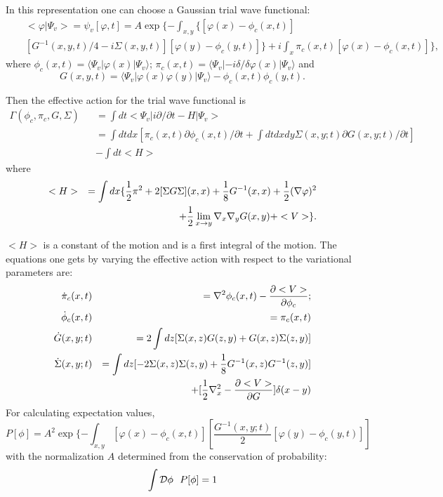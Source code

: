 \documentclass[a4paper,prd,preprint,superscriptaddress,showpacs,byrevtex]{revtex4}
\begin{document}
In this representation one can choose a Gaussian
trial wave functional:
\begin{eqnarray}
&&<\varphi|\Psi_{v}> =  \psi_{v}[\varphi,t]=  A \exp \{ -\int_{x,y} \{[\varphi
(x)-  \phi_c(x,t)] \nonumber \\
 &&[G^{-1}(x,y,t)/ 4-i\Sigma(x,y,t)][\varphi(y)-
 \phi_c (y,t)] \} + i  \int_{x}  \pi_c(x,t) [\varphi(x)-  \phi_c(x,t)] \}
\label{eq:trial},
\end{eqnarray}
where
$ \phi_c(x,t)= \langle\Psi_{v}|\varphi (x) | \Psi_{v} \rangle $;
$\pi_c(x,t) =
\langle \Psi_{v}|-i \delta/\delta\varphi(x)| \Psi_{v} \rangle$
and
\begin{equation}
G(x,y,t) = \langle \Psi_{v}|
\varphi(x)\varphi(y)| \Psi_{v} \rangle -  \phi_c(x,t)  \phi_c(y,t) .
\end{equation}

 Then the effective action for the trial wave functional is
\begin{eqnarray}
\Gamma( \phi_c,  \pi_c,G,\Sigma) &&=\int dt < \Psi_{v}| i
\partial/ \partial t -H| \Psi_{v}> \nonumber \\
&&= \int dt dx[\pi_c(x,t)\partial \phi_c(x,t)/ \partial t +\int dt dx dy
\Sigma(x,y;t )\partial G(x,y; t)/\partial t ]\nonumber \\
&&-\int dt < H >
\end{eqnarray}
where
\begin{eqnarray}
< H >&& = \int dx \{  {1 \over 2} \pi^{2} + 2 [\Sigma G\Sigma](x,x) +{1
\over 8}
G^{-1}(x,x) + {1 \over 2} (\nabla \varphi)^{2} \nonumber \\
&& + {1 \over 2}
\lim_{x \rightarrow y}  \nabla_x \nabla_y G(x,y)  + <V> \}.\label{eq:action}
\end{eqnarray}

$< H >$ is a constant of the motion and is a first integral of the motion.
The equations one gets by varying the effective action with respect to
the variational parameters are:
\begin{eqnarray}
\dot{\pi}_c(x,t)&&= \nabla^{2}\phi_c(x,t)- {\partial <V > \over \partial
\phi_c };\nonumber \\ \dot{\phi}_c (x,t) &&= \pi_c(x,t)  \nonumber \\
\dot{G}(x,y; t)&&= 2\int dz[\Sigma (x,z)G(z,y)+G(x,z)\Sigma (z,y)] \nonumber
\\
\dot{\Sigma}(x,y;t)&&=  \int dz[-2 \Sigma (x,z)\Sigma (z,y) + {1 \over 8}
G^{-1}
(x,z)G^{-1} (z,y) ]\nonumber \\
&& +  [{1 \over 2}\nabla^{2}_{x}
- {\partial < V > \over \partial G}] \delta(x-y)  \nonumber \label{eq:lgN}
\end{eqnarray}
For calculating expectation values,
\begin{equation}
P[\phi] = A^2 \exp \{ -\int_{x,y}[\varphi
(x)-  \phi_c(x,t)]
[\frac {G^{-1}(x,y;t)}{2}
[\varphi(y)-
 \phi_c (y,t)]]
\end{equation}
with the normalization $A$ determined from the conservation of probability:
\begin{equation}
\int  {\cal D} \phi~~ P[\phi] = 1
\end{equation}
\end{document}
